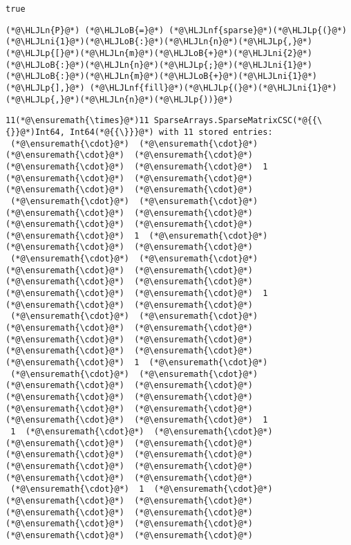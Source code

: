 \documentclass[12pt,a4paper]{article}
\newcommand{\HLJLn}[1]{#1}
\newcommand{\HLJLnf}[1]{\textcolor[RGB]{66,102,213}{#1}}
\newcommand{\HLJLni}[1]{\textcolor[RGB]{59,151,46}{#1}}
\newcommand{\HLJLoB}[1]{\textcolor[RGB]{102,102,102}{\textbf{#1}}}
\newcommand{\HLJLp}[1]{#1}
\begin{document}
\begin{lstlisting}
true
\end{lstlisting}


\begin{lstlisting}
(*@\HLJLn{P}@*) (*@\HLJLoB{=}@*) (*@\HLJLnf{sparse}@*)(*@\HLJLp{(}@*)(*@\HLJLni{1}@*)(*@\HLJLoB{:}@*)(*@\HLJLn{n}@*)(*@\HLJLp{,}@*) (*@\HLJLp{[}@*)(*@\HLJLn{m}@*)(*@\HLJLoB{+}@*)(*@\HLJLni{2}@*)(*@\HLJLoB{:}@*)(*@\HLJLn{n}@*)(*@\HLJLp{;}@*)(*@\HLJLni{1}@*)(*@\HLJLoB{:}@*)(*@\HLJLn{m}@*)(*@\HLJLoB{+}@*)(*@\HLJLni{1}@*)(*@\HLJLp{],}@*) (*@\HLJLnf{fill}@*)(*@\HLJLp{(}@*)(*@\HLJLni{1}@*)(*@\HLJLp{,}@*)(*@\HLJLn{n}@*)(*@\HLJLp{))}@*)
\end{lstlisting}

\begin{lstlisting}
11(*@\ensuremath{\times}@*)11 SparseArrays.SparseMatrixCSC(*@{{\{}}@*)Int64, Int64(*@{{\}}}@*) with 11 stored entries:
 (*@\ensuremath{\cdot}@*)  (*@\ensuremath{\cdot}@*)  (*@\ensuremath{\cdot}@*)  (*@\ensuremath{\cdot}@*)  (*@\ensuremath{\cdot}@*)  (*@\ensuremath{\cdot}@*)  1  (*@\ensuremath{\cdot}@*)  (*@\ensuremath{\cdot}@*)  (*@\ensuremath{\cdot}@*)  (*@\ensuremath{\cdot}@*)
 (*@\ensuremath{\cdot}@*)  (*@\ensuremath{\cdot}@*)  (*@\ensuremath{\cdot}@*)  (*@\ensuremath{\cdot}@*)  (*@\ensuremath{\cdot}@*)  (*@\ensuremath{\cdot}@*)  (*@\ensuremath{\cdot}@*)  1  (*@\ensuremath{\cdot}@*)  (*@\ensuremath{\cdot}@*)  (*@\ensuremath{\cdot}@*)
 (*@\ensuremath{\cdot}@*)  (*@\ensuremath{\cdot}@*)  (*@\ensuremath{\cdot}@*)  (*@\ensuremath{\cdot}@*)  (*@\ensuremath{\cdot}@*)  (*@\ensuremath{\cdot}@*)  (*@\ensuremath{\cdot}@*)  (*@\ensuremath{\cdot}@*)  1  (*@\ensuremath{\cdot}@*)  (*@\ensuremath{\cdot}@*)
 (*@\ensuremath{\cdot}@*)  (*@\ensuremath{\cdot}@*)  (*@\ensuremath{\cdot}@*)  (*@\ensuremath{\cdot}@*)  (*@\ensuremath{\cdot}@*)  (*@\ensuremath{\cdot}@*)  (*@\ensuremath{\cdot}@*)  (*@\ensuremath{\cdot}@*)  (*@\ensuremath{\cdot}@*)  1  (*@\ensuremath{\cdot}@*)
 (*@\ensuremath{\cdot}@*)  (*@\ensuremath{\cdot}@*)  (*@\ensuremath{\cdot}@*)  (*@\ensuremath{\cdot}@*)  (*@\ensuremath{\cdot}@*)  (*@\ensuremath{\cdot}@*)  (*@\ensuremath{\cdot}@*)  (*@\ensuremath{\cdot}@*)  (*@\ensuremath{\cdot}@*)  (*@\ensuremath{\cdot}@*)  1
 1  (*@\ensuremath{\cdot}@*)  (*@\ensuremath{\cdot}@*)  (*@\ensuremath{\cdot}@*)  (*@\ensuremath{\cdot}@*)  (*@\ensuremath{\cdot}@*)  (*@\ensuremath{\cdot}@*)  (*@\ensuremath{\cdot}@*)  (*@\ensuremath{\cdot}@*)  (*@\ensuremath{\cdot}@*)  (*@\ensuremath{\cdot}@*)
 (*@\ensuremath{\cdot}@*)  1  (*@\ensuremath{\cdot}@*)  (*@\ensuremath{\cdot}@*)  (*@\ensuremath{\cdot}@*)  (*@\ensuremath{\cdot}@*)  (*@\ensuremath{\cdot}@*)  (*@\ensuremath{\cdot}@*)  (*@\ensuremath{\cdot}@*)  (*@\ensuremath{\cdot}@*)  (*@\ensuremath{\cdot}@*)

\end{lstlisting}
\end{document}
